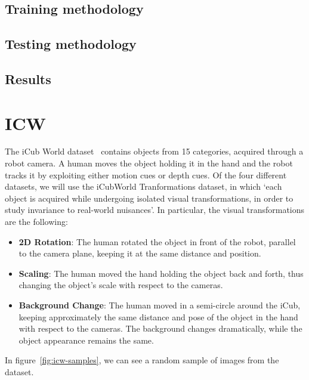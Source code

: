 \documentclass[../main.tex]{subfiles}
\begin{document}
    \subsection{Training methodology}
    \subsection{Testing methodology}
    \subsection{Results}

    \section{ICW}
    The iCub World dataset~\cite{icw} contains objects from 15 categories, acquired through a robot camera. A human moves
    the object holding it in the hand and the robot tracks it by exploiting either motion cues or depth cues. Of the
    four different datasets, we will use the iCubWorld Tranformations dataset, in which `each object is acquired while
    undergoing isolated visual transformations, in order to study invariance to real-world nuisances'.
    In particular, the visual transformations are the following:
    \begin{itemize}
        \item \textbf{2D Rotation}: The human rotated the object in front of the robot, parallel to the camera plane,
            keeping it at the same distance and position.
        \item \textbf{Scaling}: The human moved the hand holding the object back and forth, thus changing the object's
            scale with respect to the cameras.
        \item \textbf{Background Change}: The human moved in a semi-circle around the iCub, keeping approximately the same
            distance and pose of the object in the hand with respect to the cameras. The background changes dramatically,
            while the object appearance remains the same.
    \end{itemize}

    In figure~\ref{fig:icw-samples}, we can see a random sample of images from the dataset.
\end{document}
